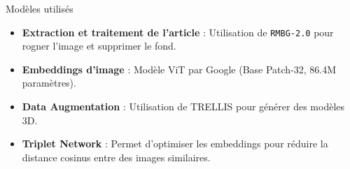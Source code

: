 \documentclass{beamer}
\begin{document}
\begin{frame}{Modèles utilisés}
    \begin{itemize}
        \item \textbf{Extraction et traitement de l'article} : Utilisation de \texttt{RMBG-2.0} pour rogner l'image et supprimer le fond. 
        \item \textbf{Embeddings d'image} : Modèle ViT par Google (Base Patch-32, 86.4M paramètres).
        \item \textbf{Data Augmentation} : Utilisation de TRELLIS pour générer des modèles 3D.
        \item \textbf{Triplet Network} : Permet d'optimiser les embeddings pour réduire la distance cosinus entre des images similaires.
    \end{itemize}
    \end{frame}
\end{document}

